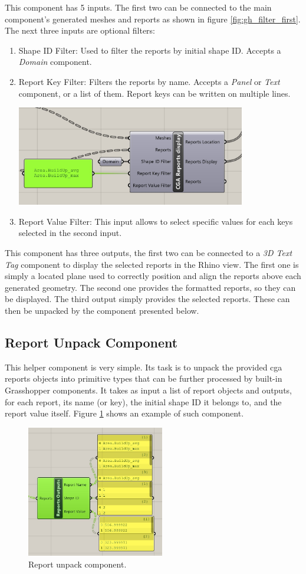 This component has 5 inputs. The first two can be connected to the main component's generated meshes and reports as shown in figure \ref{fig:gh_filter_first}. The next three inputs are optional filters:
\begin{enumerate}
    \item Shape ID Filter: Used to filter the reports by initial shape ID. Accepts a \textit{Domain} component.
    \item Report Key Filter: Filters the reports by name. Accepts a \textit{Panel} or \textit{Text} component, or a list of them. Report keys can be written on multiple lines.
   \begin{minipage}{\linewidth}
        \centering
        \includegraphics[width=10cm]{res/man_gh_filter_example.jpg}
    \end{minipage}
    \item Report Value Filter: This input allows to select specific values for each keys selected in the second input.
\end{enumerate}

This component has three outputs, the first two can be connected to a \textit{3D Text Tag} component to display the selected reports in the Rhino view. The first one is simply a located plane used to correctly position and align the reports above each generated geometry. The second one provides the formatted reports, so they can be displayed. The third output simply provides the selected reports. These can then be unpacked by the component presented below.

\subsection{Report Unpack Component}

This helper component is very simple. Its task is to unpack the provided cga reports objects into primitive types that can be further processed by built-in Grasshopper components. It takes as input a list of report objects and outputs, for each report, its name (or key), the initial shape ID it belongs to, and the report value itself. Figure \ref{fig:gh_unpack_example} shows an example of such component.

\begin{figure}
    \centering
    \includegraphics[width=60mm]{res/man_gh_report_unpack_connected.jpg}
    \caption{Report unpack component.}
    \label{fig:gh_unpack_example}
\end{figure}